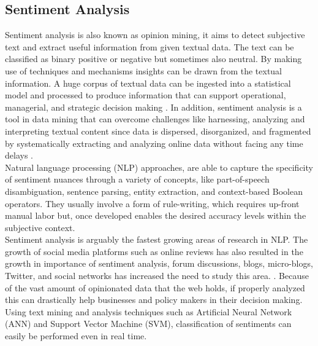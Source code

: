 \subsection{Sentiment Analysis}
Sentiment analysis is also known as opinion mining, it aims to detect subjective text and extract useful information from given textual data. The text can be classified as binary positive or negative but sometimes also neutral. 
By making use of techniques and mechanisms insights can be drawn from the textual information. A huge corpus of textual data can be ingested into a statistical model and processed to produce information that can support operational, managerial, and strategic decision making \cite{ref6}. In addition, sentiment analysis is a tool in data mining that can overcome challenges like harnessing, analyzing and interpreting textual content since data is dispersed, disorganized, and fragmented by systematically extracting and analyzing online data without facing any time delays \cite{ref7}.
\leavevmode\\

Natural language processing (NLP) approaches, are able to capture the specificity of sentiment nuances through a variety of concepts, like part-of-speech disambiguation, sentence parsing, entity extraction, and context-based Boolean operators. They usually involve a form of rule-writing, which requires up-front manual labor but, once developed enables the desired accuracy levels within the subjective context.
\leavevmode\\

Sentiment analysis is arguably the fastest growing areas of research in NLP. The growth of social media platforms such as online reviews has also resulted in the growth in importance of sentiment analysis, forum discussions, blogs, micro-blogs, Twitter, and social networks has increased the need to study this area. \cite{ref20}. Because of the vast amount of opinionated data that the web holds, if properly analyzed this can drastically help businesses and policy makers in their decision making. Using text mining and analysis techniques such as Artificial Neural Network (ANN) and Support Vector Machine (SVM), classification of sentiments can easily be performed even in real time.
\leavevmode\\


